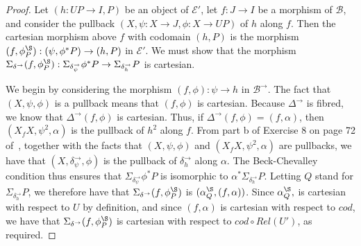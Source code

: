 \documentclass{LMCS}
\newcommand{\ra}{\rightarrow}
\newcommand\E{{\mathcal E}}
\newcommand\B{{\mathcal B}}
\theoremstyle{plain}
\theoremstyle{remark}
\theoremstyle{definition}
\begin{document}
\begin{proof}
Let $(h : UP \to I,P)$ be an object of $\E'$, let $f:J \ra I$ be a
morphism of $\B$, and consider the pullback $(X, \psi:X \ra J, \phi:X
\ra UP)$ of $h$ along $f$.  Then the cartesian morphism above $f$ with
codomain $(h,P)$ is the morphism $(f, \phi^\S_P) : (\psi,\phi^*P) \ra
(h, P)$ in $\E'$. We must show that the morphism $\Sigma_{\delta^\ra}
(f, \phi^\S_P) : \Sigma_{\delta^\to_\psi}\phi^*P \to
\Sigma_{\delta^\to_h}P$ is cartesian.

We begin by considering the morphism $(f,\phi):\psi \ra h$ in
$\B^\ra$. The fact that $(X,\psi,\phi)$ is a pullback means that
$(f,\phi)$ is cartesian. Because $\Delta^\ra$ is fibred, we know that
$\Delta^\ra (f,\phi)$ is cartesian. Thus, if $\Delta^\to (f,\phi) =
(f, \alpha)$, then $(X_f X, \psi^2, \alpha)$ is the pullback of $h^2$
along $f$.
From part b of Exercise 8 on page 72 of~\cite{mac71},
together with the facts that $(X, \psi, \phi)$ and $(X_f X, \psi^2,
\alpha)$ are pullbacks, we have that $(X,\delta^\ra_\psi, \phi)$ is
the pullback of $\delta^\ra_h$ along $\alpha$. The Beck-Chevalley
condition thus ensures that $\Sigma_{\delta^\ra_\psi} \phi^*P$ is
isomorphic to $\alpha^*\Sigma_{\delta^\ra_h}P$.  Letting $Q$ stand for
$\Sigma_{\delta^\ra_h} P$, we therefore have that $\Sigma_{\delta^\ra}
(f, \phi^\S_P)$ is $(\alpha^\S_Q, (f,\alpha))$. Since $\alpha^\S_Q,$ is
cartesian with respect to $U$ by definition, and since $(f,\alpha)$ is
cartesian with respect to $\mathit{cod}$, we have that
$\Sigma_{\delta^\ra} (f,\phi^\S_P)$ is cartesian with respect to
$\mathit{cod}\circ Rel(U')$, as required.
\end{proof}
\end{document}
